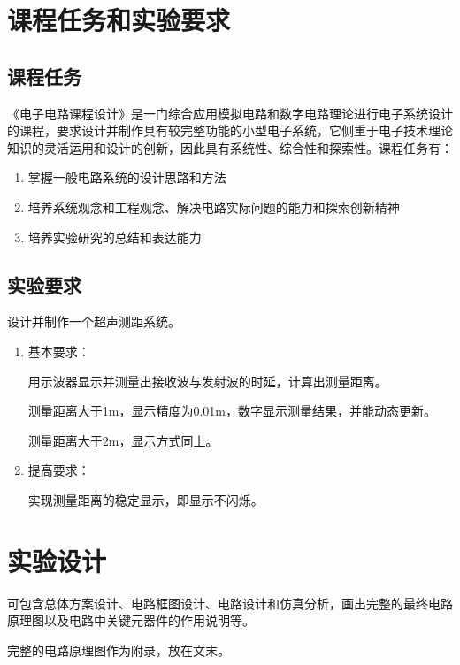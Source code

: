 \documentclass[a4paper]{ctexart}
\begin{document}
\begin{multicols}{2}

    \section{课程任务和实验要求}
    \subsection{课程任务}
    《电子电路课程设计》是一门综合应用模拟电路和数字电路理论进行电子系统设计的课程，要求设计并制作具有较完整功能的小型电子系统，它侧重于电子技术理论知识的灵活运用和设计的创新，因此具有系统性、综合性和探索性。课程任务有：
    \begin{enumerate}
        \item 掌握一般电路系统的设计思路和方法
        \item 培养系统观念和工程观念、解决电路实际问题的能力和探索创新精神
        \item 培养实验研究的总结和表达能力
    \end{enumerate}

    \subsection{实验要求}

    设计并制作一个超声测距系统。

    \begin{enumerate}
        \item 基本要求：

              用示波器显示并测量出接收波与发射波的时延，计算出测量距离。

              测量距离大于1m，显示精度为0.01m，数字显示测量结果，并能动态更新。

              测量距离大于2m，显示方式同上。

        \item 提高要求：

              实现测量距离的稳定显示，即显示不闪烁。
    \end{enumerate}

    \section{实验设计}

    可包含总体方案设计、电路框图设计、电路设计和仿真分析，画出完整的最终电路原理图以及电路中关键元器件的作用说明等。

    完整的电路原理图作为附录，放在文末。


\end{multicols}
\end{document}
